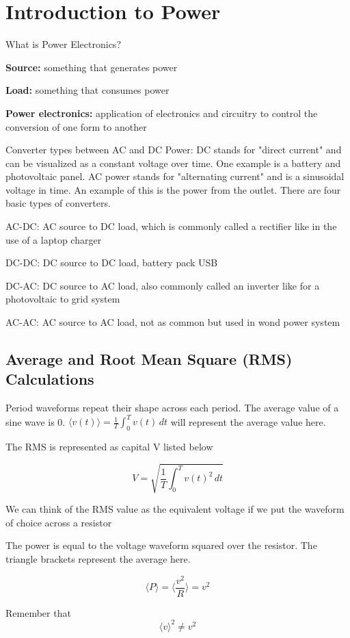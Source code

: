 \chapter{Introduction to Power}
What is Power Electronics?

\begin{pline}
    \item \textbf{Source:} something that generates power
    \item \textbf{Load:} something that consumes power
    \item \textbf{Power electronics:} application of electronics and circuitry to control the conversion of one form to another
\end{pline}

Converter types between AC and DC Power: DC stands for "direct current" and can be visualized as a constant voltage over time. One example is a battery and photovoltaic panel. AC power stands for "alternating current" and is a sinusoidal voltage in time. An example of this is the power from the outlet. There are four basic types of converters.
\begin{pline}
    \item AC-DC: AC source to DC load, which is commonly called a rectifier like in the use of a laptop charger
    \item DC-DC: DC source to DC load, battery pack USB
    \item DC-AC: DC source to AC load, also commonly called an inverter like for a photovoltaic to grid system
    \item AC-AC: AC source to AC load, not as common but used in wond power system
\end{pline}

\section{Average and Root Mean Square (RMS) Calculations}
Period waveforms repeat their shape across each period. The average value of a sine wave is 0. $\langle v(t) \rangle = \frac{1}{T} \int_0^T v(t) \,dt$ will represent the average value here.

The RMS is represented as capital V listed below
\begin{define}
    \[V = \sqrt{\frac{1}{T} \int_0^T v(t)^2 \,dt}\]
\end{define}
We can think of the RMS value as the equivalent voltage if we put the waveform of choice across a resistor

The power is equal to the voltage waveform squared over the resistor. The triangle brackets represent the average here.
\begin{define}
    \[\langle P \rangle = \langle \frac{v^2}{R} \rangle = v^2\]
\end{define}
Remember that 
\[\langle v \rangle ^2 \neq v^2\]

